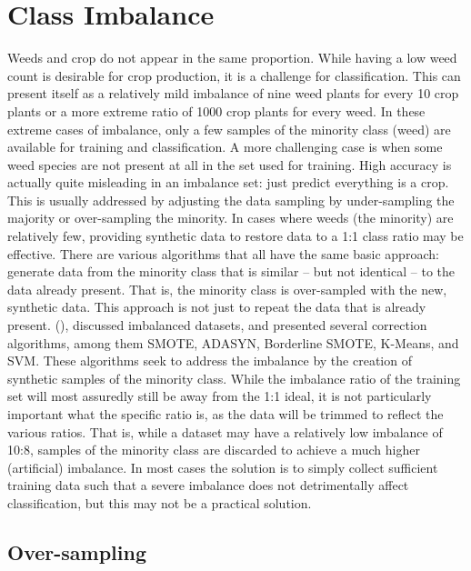 \documentclass[letterpaper, notitlepage]{report}
\begin{document}
\section{Class Imbalance}
Weeds and crop do not appear in the same proportion. While having a low weed count is desirable for crop production, it is a challenge for classification. This can present itself as a relatively mild imbalance of nine weed plants for every 10 crop plants or a more extreme ratio of 1000 crop plants for every weed. In these extreme cases of imbalance, only a few samples of the minority class (weed) are available for training and classification. A more challenging case is when some weed species are not  present at all in the set used for training.  High accuracy is actually quite misleading in an imbalance set: just predict everything is a crop. This is usually addressed by adjusting the data sampling by under-sampling the majority or over-sampling the minority. In cases where weeds (the minority) are relatively few, providing synthetic data to restore data to a 1:1 class ratio may be effective. There are various algorithms that all have the same basic approach: generate data from the minority class that is similar -- but not identical -- to the data already present. That is, the minority class is over-sampled with the new, synthetic data. This approach is not just to repeat the data that is already present. \citeauthor{Fernandez2018-fw} (\citeyear{Fernandez2018-fw}), discussed imbalanced datasets, and presented several correction algorithms, among them \gls{SMOTE}, \gls{ADASYN}, Borderline SMOTE, K-Means, and \gls{SVM}. These algorithms seek to address the imbalance by the creation of synthetic samples of the minority class. While the imbalance ratio of the training set will most assuredly still be away from the 1:1 ideal, it is not particularly important what the specific ratio is, as the data will be trimmed to reflect the various ratios. That is, while a dataset may have a relatively low imbalance of 10:8, samples of the minority class are discarded to achieve a much higher (artificial) imbalance. In most cases the solution is to simply collect sufficient training data such that a severe imbalance does not detrimentally affect classification, but this may not be a practical solution. 
\subsection{Over-sampling}
\label{section:over}
\end{document}
